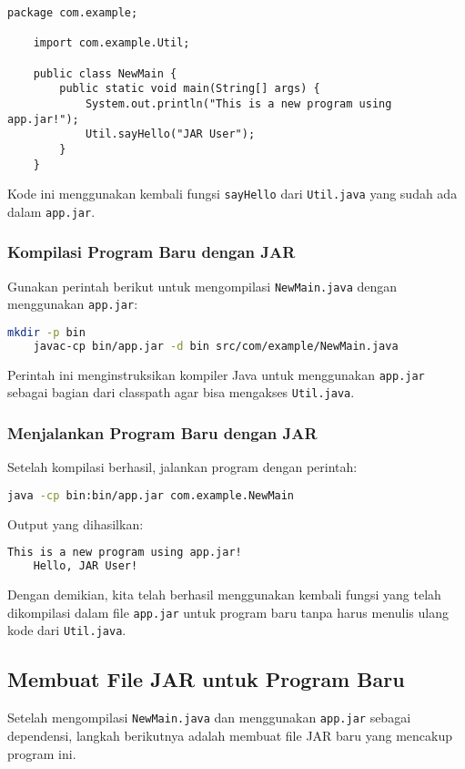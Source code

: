 \begin{lstlisting}[style=JavaStyle]
	package com.example;
	
	import com.example.Util;
	
	public class NewMain {
		public static void main(String[] args) {
			System.out.println("This is a new program using app.jar!");
			Util.sayHello("JAR User");
		}
	}
\end{lstlisting}

Kode ini menggunakan kembali fungsi \texttt{sayHello} dari \texttt{Util.java} yang sudah ada dalam \texttt{app.jar}.

\subsubsection{Kompilasi Program Baru dengan JAR}
Gunakan perintah berikut untuk mengompilasi \texttt{NewMain.java} dengan menggunakan \texttt{app.jar}:

\begin{lstlisting}[language=bash]
	mkdir -p bin
	javac-cp bin/app.jar -d bin src/com/example/NewMain.java
\end{lstlisting}

Perintah ini menginstruksikan kompiler Java untuk menggunakan \texttt{app.jar} sebagai bagian dari classpath agar bisa mengakses \texttt{Util.java}.

\subsubsection{Menjalankan Program Baru dengan JAR}
Setelah kompilasi berhasil, jalankan program dengan perintah:

\begin{lstlisting}[language=bash]
	java -cp bin:bin/app.jar com.example.NewMain
\end{lstlisting}

Output yang dihasilkan:

\begin{lstlisting}[language=bash]
	This is a new program using app.jar!
	Hello, JAR User!
\end{lstlisting}

Dengan demikian, kita telah berhasil menggunakan kembali fungsi yang telah dikompilasi dalam file \texttt{app.jar} untuk program baru tanpa harus menulis ulang kode dari \texttt{Util.java}.


\subsection{Membuat File JAR untuk Program Baru}
Setelah mengompilasi \texttt{NewMain.java} dan menggunakan \texttt{app.jar} sebagai dependensi, langkah berikutnya adalah membuat file JAR baru yang mencakup program ini.

